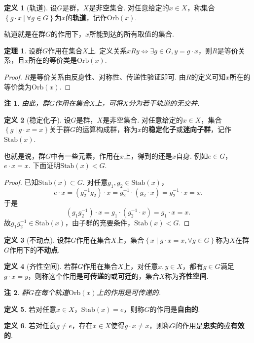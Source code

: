\documentclass[12pt]{ctexart}
\theoremstyle{definition}
\newtheorem{definition}{定义}
\newtheorem{theorem}{定理}
\theoremstyle{plain}
\newtheorem*{remark}{注}
\newcommand{\Orb}{\mathrm{Orb}}
\newcommand{\Stab}{\mathrm{Stab}}
\begin{document}
	\begin{definition}[轨道]
		设$G$是群，$X$是非空集合. 对任意给定的$x\in X$，称集合$\left\{g\cdot x\ |\ \forall g\in G\right\}$为$x$的\textbf{轨道}，记作$\Orb(x)$.
	\end{definition}
	轨道就是在群$G$的作用下，$x$所能到达的所有取值的集合.
	\begin{theorem}
		设群$G$作用在集合$X$上. 定义关系$xRy\iff \exists g\in G,y=g\cdot x$，则$R$是等价关系，且$x$所在的等价类是$\Orb(x)$.
	\end{theorem}
	\begin{proof}
		$R$是等价关系由反身性、对称性、传递性验证即可. 由$R$的定义可知$x$所在的等价类为$\Orb(x)$.
	\end{proof}
	\begin{remark}
		由此，群$G$作用在集合$X$上，可将$X$分为若干轨道的无交并.
	\end{remark}
	\begin{definition}[稳定化子]
		设$G$是群，$X$是非空集合. 对任意给定的$x\in X$，集合$\left\{g\ |\ g\cdot x=x\right\}$关于群$G$的运算构成群，称为$x$的\textbf{稳定化子}或\textbf{迷向子群}，记作$\Stab(x)$.
	\end{definition}
	也就是说，群$G$中有一些元素，作用在$x$上，得到的还是$x$自身. 例如$e\in G$，$e\cdot x=x$. 下面证明$\Stab(x)<G$.
	\begin{proof}
		已知$\Stab(x)\subset G$. 对任意$g_1,g_2\in \Stab(x)$，
		$$e\cdot x=(g_2^{-1}g_2)\cdot x=g_2^{-1}\cdot(g_2\cdot x)=g_2^{-1}\cdot x=x.$$
		于是
		$$(g_1g_2^{-1})\cdot x=g_1\cdot (g_2^{-1}\cdot x)=g_1\cdot x=x.$$
		故$g_1g_2^{-1}\in \Stab(x)$，由子群的充要条件，$\Stab(x)<G$.
	\end{proof}
	\begin{definition}[不动点]
		设群$G$作用在集合$X$上，集合$\left\{x\mid g\cdot x=x,\forall g\in G\right\}$称为$X$在群$G$作用下的\textbf{不动点}.
	\end{definition}
	\begin{definition}[齐性空间]
		若群$G$作用在集合$X$上，对任意$x,y\in X$，都有$g\in G$满足$g\cdot x=y$，则称这个作用是\textbf{可传递}的或\textbf{可迁}的，集合$X$称为\textbf{齐性空间}.
	\end{definition}
	\begin{remark}
		群$G$在每个轨道$\Orb(x)$上的作用是可传递的.
	\end{remark}
	\begin{definition}
		若对任意$x\in X$，$\Stab(x)=e$，则称$G$的作用是\textbf{自由的}.
	\end{definition}
	\begin{definition}
		若对任意$g\neq e$，存在$x\in X$使得$g\cdot x\neq x$，则称$G$的作用是\textbf{忠实的}或\textbf{有效的}.
	\end{definition}
\end{document}
